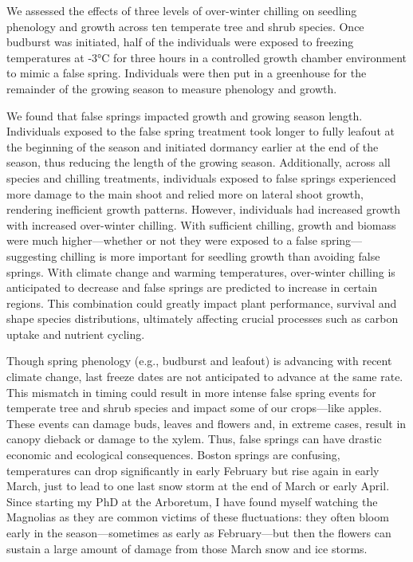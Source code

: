 \documentclass{article}\usepackage[]{graphicx}\usepackage[]{color}
\begin{document}
     We assessed the effects of three levels of over-winter chilling on seedling phenology and growth across ten temperate tree and shrub species. Once budburst was initiated, half of the individuals were exposed to freezing temperatures at -3°C for three hours in a controlled growth chamber environment to mimic a false spring. Individuals were then put in a greenhouse for the remainder of the growing season to measure phenology and growth.

We found that false springs impacted growth and growing season length. Individuals exposed to the false spring treatment took longer to fully leafout at the beginning of the season and initiated dormancy earlier at the end of the season, thus reducing the length of the growing season. Additionally, across all species and chilling treatments, individuals exposed to false springs experienced more damage to the main shoot and relied more on lateral shoot growth, rendering inefficient growth patterns. However, individuals had increased growth with increased over-winter chilling. With sufficient chilling, growth and biomass were much higher---whether or not they were exposed to a false spring---suggesting chilling is more important for seedling growth than avoiding false springs. With climate change and warming temperatures, over-winter chilling is anticipated to decrease and false springs are predicted to increase in certain regions. This combination could greatly impact plant performance, survival and shape species distributions, ultimately affecting crucial processes such as carbon uptake and nutrient cycling.

Though spring phenology (e.g., budburst and leafout) is advancing with recent climate change, last freeze dates are not anticipated to advance at the same rate. This mismatch in timing could result in more intense false spring events for temperate tree and shrub species and impact some of our crops---like apples. These events can damage buds, leaves and flowers and, in extreme cases, result in canopy dieback or damage to the xylem. Thus, false springs can have drastic economic and ecological consequences. Boston springs are confusing, temperatures can drop significantly in early February but rise again in early March, just to lead to one last snow storm at the end of March or early April. Since starting my PhD at the Arboretum, I have found myself watching the Magnolias as they are common victims of these fluctuations: they often bloom early in the season---sometimes as early as February---but then the flowers can sustain a large amount of damage from those March snow and ice storms. 
\end{document}
